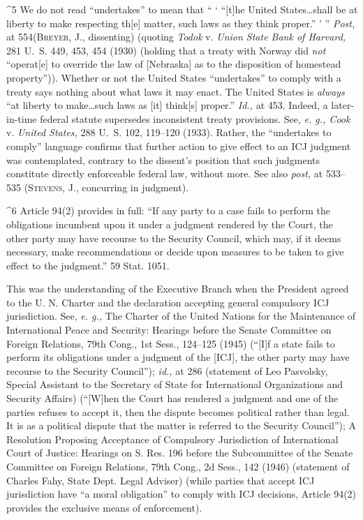 {{{^5 We do not read ``undertakes'' to mean that `` ‘ ``[t]he United
States\dots shall be at liberty to make respecting th[e] matter, such
laws as they think proper.'' ' '' \emph{Post,} at 554(\textsc{Breyer,}
J., dissenting) (quoting \emph{Todok} v. \emph{Union State Bank of Harvard,}
281 U.~S. 449, 453, 454 (1930) (holding that a treaty with Norway
did \emph{not} ``operat[e] to override the law of [Nebraska] as to the
disposition of homestead property'')). Whether or not the United
States ``undertakes'' to comply with a treaty says nothing about what
laws it may enact. The United States is \emph{always} ``at liberty to
make\dots such laws as [it] think[s] proper.'' \emph{Id.,} at 453.
Indeed, a later-in-time federal statute supersedes inconsistent treaty
provisions. See, \emph{e. g., Cook} v. \emph{United States,} 288 U.~S. 102,
119--120 (1933). Rather, the ``undertakes to comply'' language
confirms that further action to give effect to an ICJ judgment was
contemplated, contrary to the dissent's position that such judgments
constitute directly enforceable federal law, without more. See also
\emph{post,} at 533--535 (\textsc{Stevens,} J., concurring in judgment).

^6 Article 94(2) provides in full: ``If any party to a case fails to
perform the obligations incumbent upon it under a judgment rendered by
the Court, the other party may have recourse to the Security Council,
which may, if it deems necessary, make recommendations or decide upon
measures to be taken to give effect to the judgment.'' 59 Stat.
1051.

  This was the understanding of the Executive Branch when the President
agreed to the U. N. Charter and the declaration accepting general
compulsory ICJ jurisdiction. See, \emph{e. g.,} The Charter of the
United Nations for the Maintenance of International Peace and Security:
Hearings before the Senate Committee on Foreign Relations, 79th Cong.,
1st Sess., 124--125 (1945) (``[I]f a state fails to perform its
obligations under a judgment of the [ICJ], the other party may have
recourse to the Security Council''); \emph{id.,} at 286 (statement of Leo
Pasvolsky, Special Assistant to the Secretary of State for International
Organizations and Security Affairs) (``[W]hen the Court has rendered a
judgment and one of the parties refuses to accept it, then the dispute
becomes political rather than legal. It is as a political dispute
that the matter is referred to the Security Council''); A Resolution
Proposing Acceptance of Compulsory Jurisdiction of International Court
of Justice: Hearings on S. Res. 196 before the Subcommittee of the
Senate Committee on Foreign Relations, 79th Cong., 2d Sess., 142 (1946)
(statement of Charles Fahy, State Dept. Legal Adviser) (while parties
that accept ICJ jurisdiction have ``a moral obligation'' to comply
with ICJ decisions, Article 94(2) provides the exclusive means of
enforcement).

}}}
